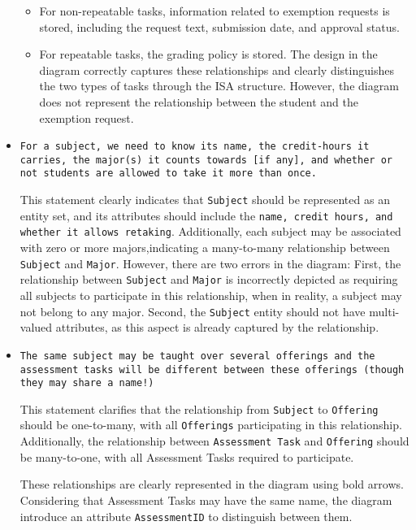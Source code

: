 \documentclass[a4paper,12pt]{article}
\begin{document}
\begin{itemize}
  \begin{itemize}
    \item For non-repeatable tasks, information related to exemption requests is stored, including the request text, submission date, and approval status.

    \item For repeatable tasks, the grading policy is stored. The design in the diagram correctly captures these relationships and clearly distinguishes the two types of tasks through the ISA structure. However, the diagram does not represent the relationship between the student and the exemption request.
  \end{itemize}


  \item \texttt{For a subject, we need to know its name, the credit-hours it carries, the major(s) it counts towards [if any], and whether or not students are allowed to take it more than once.}

  This statement clearly indicates that \texttt{Subject} should be represented as an entity set, and its attributes should include the \texttt{name, credit hours, and whether it allows retaking}. Additionally, each subject may be associated with zero or more majors,indicating a many-to-many relationship between \texttt{Subject} and \texttt{Major}. However, there are two errors in the diagram: First, the relationship between \texttt{Subject} and \texttt{Major} is incorrectly depicted as requiring all subjects to participate in this relationship, when in reality, a subject may not belong to any major. Second, the \texttt{Subject} entity should not have multi-valued attributes, as this aspect is already captured by the relationship.

  \item \texttt{The same subject may be taught over several offerings and the assessment tasks will be different between these offerings (though they may share a name!)}

  This statement clarifies that the relationship from \texttt{Subject} to \texttt{Offering} should be one-to-many, with all \texttt{Offerings} participating in this relationship. Additionally, the relationship between \texttt{Assessment Task} and \texttt{Offering} should be many-to-one, with all Assessment Tasks required to participate. 

  These relationships are clearly represented in the diagram using bold arrows. Considering that Assessment Tasks may have the same name, the diagram introduce an attribute \texttt{AssessmentID} to distinguish between them.


\end{itemize}
\end{document}
